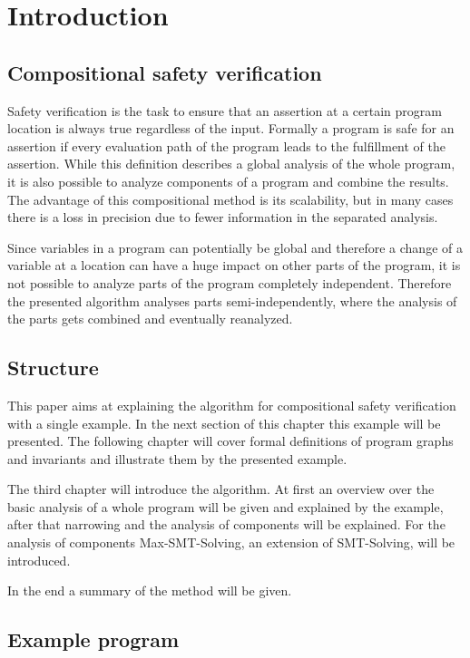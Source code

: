 \section{Introduction}
\label{sec:introduction}

\subsection{Compositional safety verification}

Safety verification is the task to ensure that an assertion at a certain program location is always true regardless of the input.
Formally a program is safe for an assertion if every evaluation path of the program leads to the fulfillment of the assertion.
While this definition describes a global analysis of the whole program, it is also possible to analyze components of a program and combine the results.
The advantage of this compositional method is its scalability, but in many cases there is a loss in precision due to fewer information in the separated analysis.

Since variables in a program can potentially be global and therefore a change of a variable at a location can have a huge impact on other parts of the program, it is not possible to analyze parts of the program completely independent. 
Therefore the presented algorithm analyses parts semi-independently, where the analysis of the parts gets combined and eventually reanalyzed.

\subsection{Structure}

This paper aims at explaining the algorithm for compositional safety verification with a single example.
In the next section of this chapter this example will be presented.
The following chapter will cover formal definitions of program graphs and invariants and illustrate them by the presented example.

The third chapter will introduce the algorithm. 
At first an overview over the basic analysis of a whole program will be given and explained by the example, after that narrowing and the analysis of components will be explained.
For the analysis of components Max-SMT-Solving, an extension of SMT-Solving, will be introduced.

In the end a summary of the method will be given.

\subsection{Example program}

